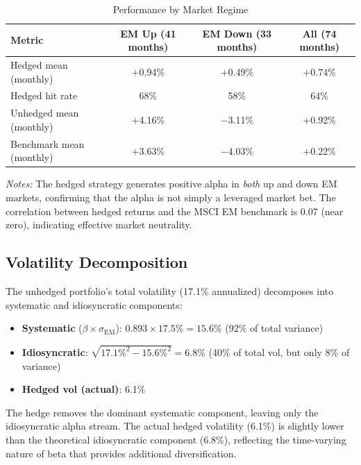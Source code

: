 \documentclass[12pt,a4paper]{article}
\begin{document}
\begin{table}[H]
\centering
\caption{Performance by Market Regime}
\label{tab:regime}
\small
\begin{tabular}{lccc}
\toprule
\textbf{Metric} & \textbf{EM Up (41 months)} & \textbf{EM Down (33 months)} & \textbf{All (74 months)} \\
\midrule
Hedged mean (monthly)      & $+$0.94\% & $+$0.49\% & $+$0.74\% \\
Hedged hit rate             & 68\%      & 58\%      & 64\% \\
Unhedged mean (monthly)     & $+$4.16\% & $-$3.11\% & $+$0.92\% \\
Benchmark mean (monthly)    & $+$3.63\% & $-$4.03\% & $+$0.22\% \\
\bottomrule
\end{tabular}
\begin{minipage}{\textwidth}
\vspace{0.3em}
\footnotesize
\textit{Notes:} The hedged strategy generates positive alpha in \emph{both} up and down EM markets, confirming that the alpha is not simply a leveraged market bet. The correlation between hedged returns and the MSCI EM benchmark is 0.07 (near zero), indicating effective market neutrality.
\end{minipage}
\end{table}

\subsection{Volatility Decomposition}

The unhedged portfolio's total volatility (17.1\% annualized) decomposes into systematic and idiosyncratic components:

\begin{itemize}
    \item \textbf{Systematic} ($\beta \times \sigma_{\text{EM}}$): $0.893 \times 17.5\% = 15.6\%$ (92\% of total variance)
    \item \textbf{Idiosyncratic}: $\sqrt{17.1\%^2 - 15.6\%^2} = 6.8\%$ (40\% of total vol, but only 8\% of variance)
    \item \textbf{Hedged vol (actual)}: 6.1\%
\end{itemize}

The hedge removes the dominant systematic component, leaving only the idiosyncratic alpha stream. The actual hedged volatility (6.1\%) is slightly lower than the theoretical idiosyncratic component (6.8\%), reflecting the time-varying nature of beta that provides additional diversification.
\end{document}
